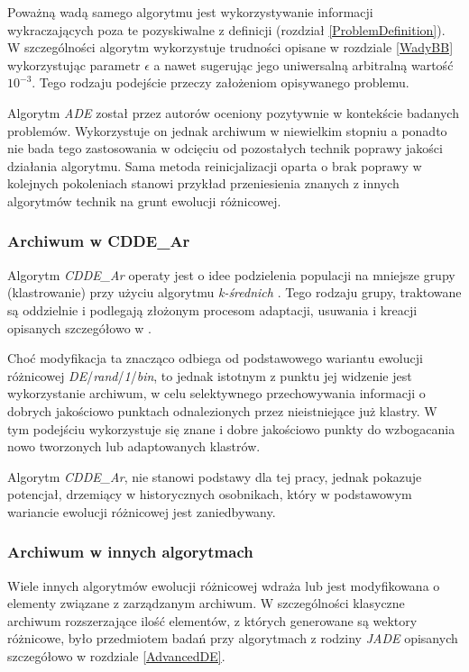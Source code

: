 \documentclass[12pt,a4paper]{report}
\begin{document}
{{{{\begin{description}
\end{description}
}
\par{
Poważną wadą samego algorytmu jest wykorzystywanie informacji wykraczających poza te pozyskiwalne z definicji (rozdział \ref{ProblemDefinition}). W szczególności algorytm wykorzystuje trudności opisane w rozdziale \ref{WadyBB} wykorzystując parametr $\epsilon$ a nawet sugerując jego uniwersalną arbitralną wartość $10^{-3}$. Tego rodzaju podejście przeczy założeniom opisywanego problemu.
}
\par{
Algorytm \emph{ADE} został przez autorów oceniony pozytywnie w kontekście badanych problemów. Wykorzystuje on jednak archiwum w niewielkim stopniu a ponadto nie bada tego zastosowania w odcięciu od pozostałych technik poprawy jakości działania algorytmu. Sama metoda reinicjalizacji oparta o brak poprawy w kolejnych pokoleniach stanowi przykład przeniesienia znanych z innych algorytmów technik na grunt ewolucji różnicowej.
}

\subsubsection{Archiwum w CDDE{\_}Ar \cite{ClusterArchiveDE}}
\par{
Algorytm \emph{CDDE{\_}Ar} operaty jest o idee podzielenia populacji na mniejsze grupy (klastrowanie) przy użyciu algorytmu \emph{k-średnich} \cite{KMeans}. Tego rodzaju grupy, traktowane są oddzielnie i podlegają złożonym procesom adaptacji, usuwania i kreacji opisanych szczegółowo w \cite{ClusterArchiveDE}.
}
\par{
Choć modyfikacja ta znacząco odbiega od podstawowego wariantu ewolucji różnicowej \emph{DE}/\emph{rand}/\emph{1}/\emph{bin}, to jednak istotnym z punktu jej widzenie jest wykorzystanie archiwum, w celu selektywnego przechowywania informacji o dobrych jakościowo punktach odnalezionych przez nieistniejące już klastry. W tym podejściu wykorzystuje się znane i dobre jakościowo punkty do wzbogacania nowo tworzonych lub adaptowanych klastrów.
}
\par{
Algorytm \emph{CDDE{\_}Ar}, nie stanowi podstawy dla tej pracy, jednak pokazuje potencjał, drzemiący w historycznych osobnikach, który w podstawowym wariancie ewolucji różnicowej jest zaniedbywany.
}

\subsubsection{Archiwum w innych algorytmach}
Wiele innych algorytmów ewolucji różnicowej wdraża lub jest modyfikowana o elementy związane z zarządzanym archiwum. W szczególności klasyczne archiwum rozszerzające ilość elementów, z których generowane są wektory różnicowe, było przedmiotem badań przy algorytmach z rodziny \emph{JADE} \cite{JADE, SHADE, JADE2} opisanych szczegółowo w rozdziale \ref{AdvancedDE}.

}}}
\end{document}
